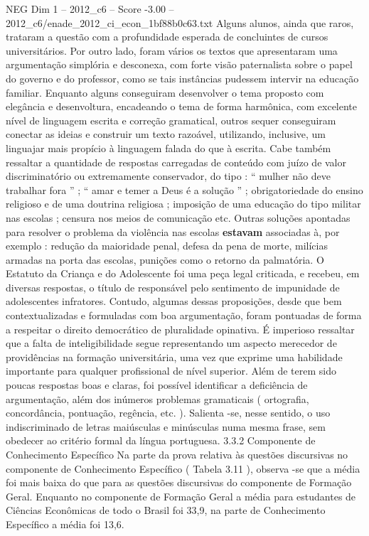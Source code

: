\begin{textsample}{NEG Dim 1 – 2012\_c6 – Score -3.00 – 2012\_c6/enade\_2012\_ci\_econ\_1bf88b0c63.txt}
Alguns alunos, ainda que raros, trataram a questão com a profundidade esperada de concluintes de cursos universitários.
Por outro lado, foram vários os textos que apresentaram uma argumentação simplória e desconexa, com forte visão paternalista sobre o papel do governo e do professor, como se tais instâncias pudessem intervir na educação familiar.
Enquanto alguns conseguiram desenvolver o tema proposto com elegância e desenvoltura, encadeando o tema de forma harmônica, com excelente nível de linguagem escrita e correção gramatical, outros sequer conseguiram conectar as ideias e construir um texto razoável, utilizando, inclusive, um linguajar mais propício à linguagem falada do que à escrita.
Cabe também ressaltar a quantidade de respostas carregadas de conteúdo com juízo de valor discriminatório ou extremamente conservador, do tipo : “ mulher não deve trabalhar fora ” ; “ amar e temer a Deus é a solução ” ; obrigatoriedade do ensino religioso e de uma doutrina religiosa ; imposição de uma educação do tipo militar nas escolas ; censura nos meios de comunicação etc.
Outras soluções apontadas para resolver o problema da violência nas escolas \textbf{estavam} associadas à, por exemplo : redução da maioridade penal, defesa da pena de morte, milícias armadas na porta das escolas, punições como o retorno da palmatória.
O Estatuto da Criança e do Adolescente foi uma peça legal criticada, e recebeu, em diversas respostas, o título de responsável pelo sentimento de impunidade de adolescentes infratores.
Contudo, algumas dessas proposições, desde que bem contextualizadas e formuladas com boa argumentação, foram pontuadas de forma a respeitar o direito democrático de pluralidade opinativa.
É imperioso ressaltar que a falta de inteligibilidade segue representando um aspecto merecedor de providências na formação universitária, uma vez que exprime uma habilidade importante para qualquer profissional de nível superior.
Além de terem sido poucas respostas boas e claras, foi possível identificar a deficiência de argumentação, além dos inúmeros problemas gramaticais ( ortografia, concordância, pontuação, regência, etc. ).
Salienta -se, nesse sentido, o uso indiscriminado de letras maiúsculas e minúsculas numa mesma frase, sem obedecer ao critério formal da língua portuguesa. 3.3.2 Componente de Conhecimento Específico Na parte da prova relativa às questões discursivas no componente de Conhecimento Específico ( Tabela 3.11 ), observa -se que a média foi mais baixa do que para as questões discursivas do componente de Formação Geral.
Enquanto no componente de Formação Geral a média para estudantes de Ciências Econômicas de todo o Brasil foi 33,9, na parte de Conhecimento Específico a média foi 13,6.

\end{textsample}
